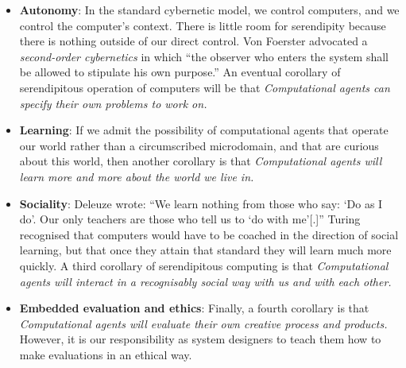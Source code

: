\begin{itemize}
\item \textbf{Autonomy}: In the standard cybernetic model, we control computers, and we control the computer's context.  There is little room for serendipity because there is nothing outside of our direct control. Von Foerster \citeyear[p. 286]{von2003cybernetics} advocated a \emph{second-order cybernetics} in which ``the observer who enters the system shall be allowed to stipulate his own purpose.'' An eventual corollary of serendipitous operation of computers will be that \emph{Computational agents can specify their own problems to work on.}
\item \textbf{Learning}: If we admit the possibility of computational agents that operate our world rather than a circumscribed microdomain, and that are curious about this world, then another corollary is that \emph{Computational agents will learn more and more about the world we live in.}
\item \textbf{Sociality}:  Deleuze \citeyear[p. 26]{deleuze1994difference} wrote: ``We learn nothing from those who say: `Do as I do'. Our only teachers are those who tell us to `do with me'[.]''  Turing recognised that computers would have to be coached in the direction of social learning, but that once they attain that standard they will learn much more quickly.  A third corollary of serendipitous computing is that \emph{Computational agents will interact in a recognisably social way with us and with each other.}
\item \textbf{Embedded evaluation and ethics}: Finally, a fourth corollary is that \emph{Computational agents will evaluate their own creative process and products.}
However, it is our responsibility as system designers to teach them how
to make evaluations in an ethical way.
\end{itemize}


